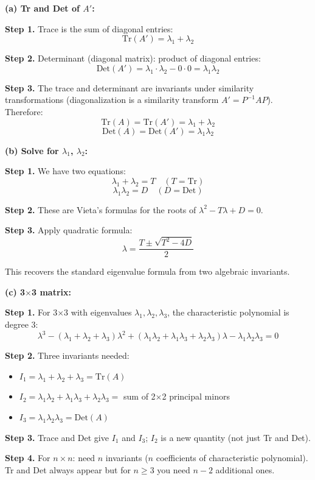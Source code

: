 \documentclass[10pt]{article}
\begin{document}
\begin{solution}
\textbf{(a) Tr and Det of $A'$:}

\textbf{Step 1.} Trace is the sum of diagonal entries:
\[
\text{Tr}(A') = \lambda_1 + \lambda_2
\]

\textbf{Step 2.} Determinant (diagonal matrix): product of diagonal entries:
\[
\text{Det}(A') = \lambda_1 \cdot \lambda_2 - 0\cdot 0 = \lambda_1\lambda_2
\]

\textbf{Step 3.} The trace and determinant are invariants under similarity transformations (diagonalization is a similarity transform $A' = P^{-1}AP$). Therefore:
\[
\text{Tr}(A) = \text{Tr}(A') = \lambda_1 + \lambda_2
\]
\[
\text{Det}(A) = \text{Det}(A') = \lambda_1\lambda_2
\]

\medskip\textbf{(b) Solve for $\lambda_1$, $\lambda_2$:}

\textbf{Step 1.} We have two equations:
\[
\lambda_1 + \lambda_2 = T \quad (T = \text{Tr})
\]
\[
\lambda_1\lambda_2 = D \quad (D = \text{Det})
\]

\textbf{Step 2.} These are Vieta's formulas for the roots of $\lambda^2 - T\lambda + D = 0$.

\textbf{Step 3.} Apply quadratic formula:
\[
\lambda = \frac{T \pm \sqrt{T^2 - 4D}}{2}
\]

This recovers the standard eigenvalue formula from two algebraic invariants.

\medskip\textbf{(c) 3$\times$3 matrix:}

\textbf{Step 1.} For 3$\times$3 with eigenvalues $\lambda_1, \lambda_2, \lambda_3$, the characteristic polynomial is degree 3:
\[
\lambda^3 - (\lambda_1+\lambda_2+\lambda_3)\lambda^2 + (\lambda_1\lambda_2+\lambda_1\lambda_3+\lambda_2\lambda_3)\lambda - \lambda_1\lambda_2\lambda_3 = 0
\]

\textbf{Step 2.} Three invariants needed:
\begin{itemize}
\item $I_1 = \lambda_1+\lambda_2+\lambda_3 = \text{Tr}(A)$
\item $I_2 = \lambda_1\lambda_2+\lambda_1\lambda_3+\lambda_2\lambda_3 = $ sum of 2$\times$2 principal minors
\item $I_3 = \lambda_1\lambda_2\lambda_3 = \text{Det}(A)$
\end{itemize}

\textbf{Step 3.} Trace and Det give $I_1$ and $I_3$; $I_2$ is a new quantity (not just Tr and Det).

\textbf{Step 4.} For $n\times n$: need $n$ invariants ($n$ coefficients of characteristic polynomial). Tr and Det always appear but for $n \geq 3$ you need $n-2$ additional ones.
\end{solution}
\end{document}
